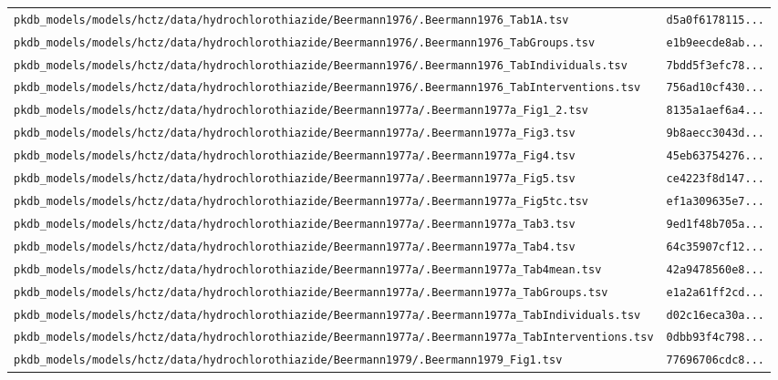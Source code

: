 \documentclass{article}
\begin{document}
\begin{longtable}{ll}
\texttt{pkdb\_models/models/hctz/data/hydrochlorothiazide/Beermann1976/.Beermann1976\_Tab1A.tsv} & \texttt{d5a0f6178115...} \\
\texttt{pkdb\_models/models/hctz/data/hydrochlorothiazide/Beermann1976/.Beermann1976\_TabGroups.tsv} & \texttt{e1b9eecde8ab...} \\
\texttt{pkdb\_models/models/hctz/data/hydrochlorothiazide/Beermann1976/.Beermann1976\_TabIndividuals.tsv} & \texttt{7bdd5f3efc78...} \\
\texttt{pkdb\_models/models/hctz/data/hydrochlorothiazide/Beermann1976/.Beermann1976\_TabInterventions.tsv} & \texttt{756ad10cf430...} \\
\texttt{pkdb\_models/models/hctz/data/hydrochlorothiazide/Beermann1977a/.Beermann1977a\_Fig1\_2.tsv} & \texttt{8135a1aef6a4...} \\
\texttt{pkdb\_models/models/hctz/data/hydrochlorothiazide/Beermann1977a/.Beermann1977a\_Fig3.tsv} & \texttt{9b8aecc3043d...} \\
\texttt{pkdb\_models/models/hctz/data/hydrochlorothiazide/Beermann1977a/.Beermann1977a\_Fig4.tsv} & \texttt{45eb63754276...} \\
\texttt{pkdb\_models/models/hctz/data/hydrochlorothiazide/Beermann1977a/.Beermann1977a\_Fig5.tsv} & \texttt{ce4223f8d147...} \\
\texttt{pkdb\_models/models/hctz/data/hydrochlorothiazide/Beermann1977a/.Beermann1977a\_Fig5tc.tsv} & \texttt{ef1a309635e7...} \\
\texttt{pkdb\_models/models/hctz/data/hydrochlorothiazide/Beermann1977a/.Beermann1977a\_Tab3.tsv} & \texttt{9ed1f48b705a...} \\
\texttt{pkdb\_models/models/hctz/data/hydrochlorothiazide/Beermann1977a/.Beermann1977a\_Tab4.tsv} & \texttt{64c35907cf12...} \\
\texttt{pkdb\_models/models/hctz/data/hydrochlorothiazide/Beermann1977a/.Beermann1977a\_Tab4mean.tsv} & \texttt{42a9478560e8...} \\
\texttt{pkdb\_models/models/hctz/data/hydrochlorothiazide/Beermann1977a/.Beermann1977a\_TabGroups.tsv} & \texttt{e1a2a61ff2cd...} \\
\texttt{pkdb\_models/models/hctz/data/hydrochlorothiazide/Beermann1977a/.Beermann1977a\_TabIndividuals.tsv} & \texttt{d02c16eca30a...} \\
\texttt{pkdb\_models/models/hctz/data/hydrochlorothiazide/Beermann1977a/.Beermann1977a\_TabInterventions.tsv} & \texttt{0dbb93f4c798...} \\
\texttt{pkdb\_models/models/hctz/data/hydrochlorothiazide/Beermann1979/.Beermann1979\_Fig1.tsv} & \texttt{77696706cdc8...} \\

\end{longtable}
\end{document}
